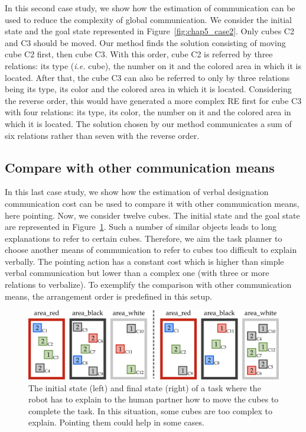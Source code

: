 In this second case study, we show how the estimation of communication can be used to reduce the complexity of global communication. We consider the initial state and the goal state represented in Figure~\ref{fig:chap5_case2}. Only cubes C2 and C3 should be moved. Our method finds the solution consisting of moving cube C2 first, then cube C3. With this order, cube C2 is referred by three relations: its type (\textit{i.e.} cube), the number on it and the colored area in which it is located. After that, the cube C3 can also be referred to only by three relations being its type, its color and the colored area in which it is located. Considering the reverse order, this would have generated a more complex RE first for cube C3 with four relations: its type, its color, the number on it and the colored area in which it is located.
The solution chosen by our method communicates a sum of six relations rather than seven with the reverse order.

\subsection{Compare with other communication means}

In this last case study, we show how the estimation of verbal designation communication cost can be used to compare it with other communication means, here pointing. Now, we consider twelve cubes. The initial state and the goal state are represented in Figure~\ref{fig:chap5_case3}. Such a number of similar objects leads to long explanations to refer to certain cubes. Therefore, we aim the task planner to choose another means of communication to refer to cubes too difficult to explain verbally. The pointing action has a constant cost which is higher than simple verbal communication but lower than a complex one (with three or more relations to verbalize). To exemplify the comparison with other communication means, the arrangement order is predefined in this setup.

\begin{figure}[!ht]
\centering
\includegraphics[width=\textwidth]{figures/chapter5/results_case3.png}
\caption{\label{fig:chap5_case3} The initial state (left) and final state (right) of a task where the robot has to explain to the human partner how to move the cubes to complete the task. In this situation, some cubes are too complex to explain. Pointing them could help in some cases. }
\end{figure}
 
